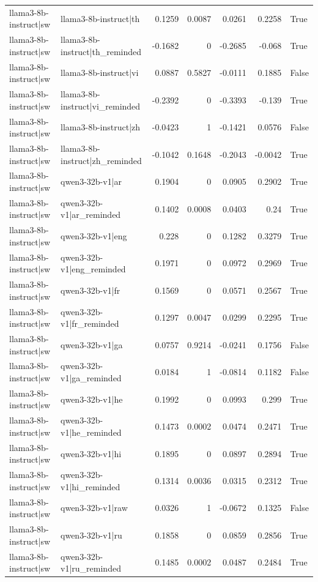 \begin{table}
\begin{tabular}{l l r r r r l}
llama3-8b-instruct|sw & llama3-8b-instruct|th & 0.1259 & 0.0087 & 0.0261 & 0.2258 & True \\
llama3-8b-instruct|sw & llama3-8b-instruct|th_reminded & -0.1682 & 0 & -0.2685 & -0.068 & True \\
llama3-8b-instruct|sw & llama3-8b-instruct|vi & 0.0887 & 0.5827 & -0.0111 & 0.1885 & False \\
llama3-8b-instruct|sw & llama3-8b-instruct|vi_reminded & -0.2392 & 0 & -0.3393 & -0.139 & True \\
llama3-8b-instruct|sw & llama3-8b-instruct|zh & -0.0423 & 1 & -0.1421 & 0.0576 & False \\
llama3-8b-instruct|sw & llama3-8b-instruct|zh_reminded & -0.1042 & 0.1648 & -0.2043 & -0.0042 & True \\
llama3-8b-instruct|sw & qwen3-32b-v1|ar & 0.1904 & 0 & 0.0905 & 0.2902 & True \\
llama3-8b-instruct|sw & qwen3-32b-v1|ar_reminded & 0.1402 & 0.0008 & 0.0403 & 0.24 & True \\
llama3-8b-instruct|sw & qwen3-32b-v1|eng & 0.228 & 0 & 0.1282 & 0.3279 & True \\
llama3-8b-instruct|sw & qwen3-32b-v1|eng_reminded & 0.1971 & 0 & 0.0972 & 0.2969 & True \\
llama3-8b-instruct|sw & qwen3-32b-v1|fr & 0.1569 & 0 & 0.0571 & 0.2567 & True \\
llama3-8b-instruct|sw & qwen3-32b-v1|fr_reminded & 0.1297 & 0.0047 & 0.0299 & 0.2295 & True \\
llama3-8b-instruct|sw & qwen3-32b-v1|ga & 0.0757 & 0.9214 & -0.0241 & 0.1756 & False \\
llama3-8b-instruct|sw & qwen3-32b-v1|ga_reminded & 0.0184 & 1 & -0.0814 & 0.1182 & False \\
llama3-8b-instruct|sw & qwen3-32b-v1|he & 0.1992 & 0 & 0.0993 & 0.299 & True \\
llama3-8b-instruct|sw & qwen3-32b-v1|he_reminded & 0.1473 & 0.0002 & 0.0474 & 0.2471 & True \\
llama3-8b-instruct|sw & qwen3-32b-v1|hi & 0.1895 & 0 & 0.0897 & 0.2894 & True \\
llama3-8b-instruct|sw & qwen3-32b-v1|hi_reminded & 0.1314 & 0.0036 & 0.0315 & 0.2312 & True \\
llama3-8b-instruct|sw & qwen3-32b-v1|raw & 0.0326 & 1 & -0.0672 & 0.1325 & False \\
llama3-8b-instruct|sw & qwen3-32b-v1|ru & 0.1858 & 0 & 0.0859 & 0.2856 & True \\
llama3-8b-instruct|sw & qwen3-32b-v1|ru_reminded & 0.1485 & 0.0002 & 0.0487 & 0.2484 & True \\

\end{tabular}
\end{table}
